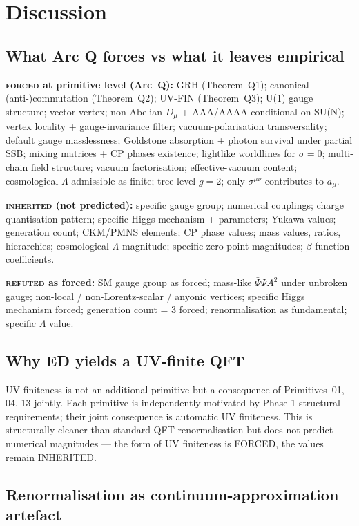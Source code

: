 \documentclass[11pt,a4paper]{article}
\begin{document}
\section{Discussion}

\subsection{What Arc Q forces vs what it leaves empirical}

\textbf{\textsc{forced} at primitive level (Arc~Q):} GRH (Theorem~Q1); canonical (anti-)commutation (Theorem~Q2); UV-FIN (Theorem~Q3); U(1) gauge structure; vector vertex; non-Abelian $D_\mu$ + AAA/AAAA conditional on SU(N); vertex locality + gauge-invariance filter; vacuum-polarisation transversality; default gauge masslessness; Goldstone absorption + photon survival under partial SSB; mixing matrices + CP phases existence; lightlike worldlines for $\sigma = 0$; multi-chain field structure; vacuum factorisation; effective-vacuum content; cosmological-$\Lambda$ admissible-as-finite; tree-level $g = 2$; only $\sigma^{\mu\nu}$ contributes to $a_\mu$.

\textbf{\textsc{inherited} (not predicted):} specific gauge group; numerical couplings; charge quantisation pattern; specific Higgs mechanism + parameters; Yukawa values; generation count; CKM/PMNS elements; CP phase values; mass values, ratios, hierarchies; cosmological-$\Lambda$ magnitude; specific zero-point magnitudes; $\beta$-function coefficients.

\textbf{\textsc{refuted} as forced:} SM gauge group as forced; mass-like $\bar\Psi\Psi A^2$ under unbroken gauge; non-local / non-Lorentz-scalar / anyonic vertices; specific Higgs mechanism forced; generation count = 3 forced; renormalisation as fundamental; specific $\Lambda$ value.

\subsection{Why ED yields a UV-finite QFT}

UV finiteness is not an additional primitive but a consequence of Primitives~01, 04, 13 jointly. Each primitive is independently motivated by Phase-1 structural requirements; their joint consequence is automatic UV finiteness. This is structurally cleaner than standard QFT renormalisation but does not predict numerical magnitudes --- the form of UV finiteness is FORCED, the values remain INHERITED.

\subsection{Renormalisation as continuum-approximation artefact}
\end{document}
